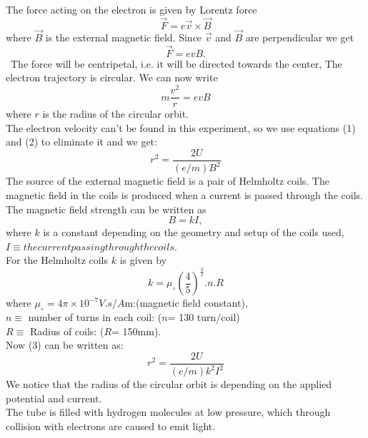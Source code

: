\documentclass[10pt,a4paper]{report}
\begin{document}
	
	{\large The force acting on the electron is given by Lorentz force
	$$\vec{F}=e\vec{v}\times \vec{B}$$
	where $\vec{B}$ is the external magnetic field. Since $\vec{v}$ 
	and $\vec{B}$ are perpendicular we get
	$$\vec{F}=evB.$$\
	The force will be centripetal, i.e. it will be directed towards the center,
	 The electron trajectory is circular. We can now write
		\begin{equation}
			m \frac{v^{2}}{r}=evB
		\end{equation}
	where $r$ is the radius of the circular orbit.\\
	The electron velocity can't be found in this experiment, so we use equations 
	(1) and (2) to eliminate it and we get:
		\begin{equation}
			r^{2}=\frac{2U}{(e/m)B^{2}}
		\end{equation}
	The source of the external magnetic field is a pair of Helmholtz coils. 
	The magnetic field in the coils is produced when a current is passed through
	 the coils. The magnetic field strength can be written as
		\begin{equation*}
	B=kI,
		\end{equation*}
	where $k$ is a constant depending on the geometry and setup of the coils used, 
	$I\equiv the current passing through the coils.$\\
	For the Helmholtz coils $k$ is given by
		\begin{equation*}
	k=\mu_{\circ}(\frac{4}{5})^{\frac{3}{2}}.n.R
		\end{equation*}
	where $\mu_{\circ}=4\pi \times 10^{-7}V.s/A$m:(magnetic field constant),\\
	$n\equiv$ number of turns in each coil: ($ n $= 130 turn/coil)\\ 
	$R\equiv$ Radius of coils: ($R$= 150mm).\\
	Now (3) can be written as:
		\begin{equation}
	r^{2}=\frac{2U}{(e/m)k^{2}I^{2}} 
		\end{equation}
	We notice that the radius of the circular orbit is depending on the applied
	 potential and current.\\
	The tube is filled with hydrogen molecules at low pressure, which through 
	collision with electrons are caused to emit light.}
\end{document}
